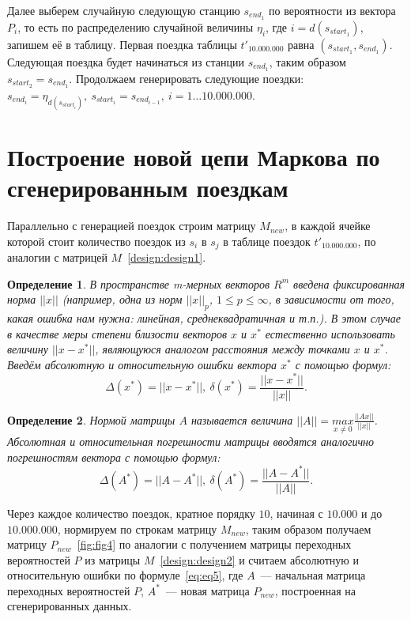 \documentclass[specialist, substylefile = spbu_report.rtx, subf,href,colorlinks=true, 12pt]{disser}
\newtheorem{mydef}{Определение}
\begin{document}
Далее выберем случайную следующую станцию $s_{end_1}$ по вероятности из вектора $P_i$, то есть по распределению случайной величины $\eta_i$, где $i = d(s_{start_1})$, запишем её в таблицу. Первая поездка таблицы $t'_{10.000.000}$ равна $\left(s_{start_1}, s_{end_1}\right)$. Следующая поездка будет начинаться из станции $s_{end_1}$, таким образом $s_{start_2} = s_{end_1}$. Продолжаем генерировать следующие поездки: $s_{end_i} = \eta_{d(s_{start_i})}, \ s_{start_i} = s_{end_{i-1}}, \ i = 1 \ldots 10.000.000$.

\section{Построение новой цепи Маркова по сгенерированным поездкам}
Параллельно с генерацией поездок строим матрицу $M_{new}$, в каждой ячейке которой стоит количество поездок из $s_i$ в $s_j$ в таблице поездок $t'_{10.000.000}$, по аналогии с матрицей $M$~\eqref{design:design1}.

\begin{mydef}\label{eq:eq4}
	В пространстве m-мерных векторов $R^m$ введена фиксированная норма $||x||$ (например, одна из норм $||x||_p$, $1 \leq p \leq \infty$, в зависимости от того, какая ошибка нам нужна: линейная, среднеквадратичная и т.п.). В этом случае в качестве меры степени близости векторов $x$ и $x^{*}$ естественно использовать величину $||x - x^{*}||$, являющуюся аналогом расстояния между точками $x$ и $x^{*}$. \\ Введём абсолютную и относительную ошибки вектора $x^{*}$ с помощью формул:
	\begin{equation*}
		\Delta\left(x^{*}\right) = ||x - x^{*}||, \  \delta\left(x^{*}\right) = \frac{||x - x^{*}||}{||x||}. 
	\end{equation*}
\end{mydef}

\begin{mydef}\label{eq:eq5}
	Нормой матрицы $A$ называется величина $||A|| = \underset{x \neq 0}{max}\frac{||Ax||}{||x||}$. \\
	Абсолютная и относительная погрешности матрицы вводятся аналогично погрешностям вектора с помощью формул:
	\begin{equation*}
		\Delta\left(A^{*}\right) = ||A - A^{*}||, \
		\delta\left(A^{*}\right) = \frac{||A - A^{*}||}{||A||}.
	\end{equation*}
\end{mydef}

Через каждое количество поездок, кратное порядку $10$, начиная с $10.000$ и до $10.000.000$, нормируем по строкам матрицу $M_{new}$, таким образом получаем матрицу $P_{new}$~\eqref{fig:fig4} по аналогии с получением матрицы переходных вероятностей $P$ из матрицы $M$~\eqref{design:design2} и считаем абсолютную и относительную ошибки по формуле~\eqref{eq:eq5}, где $A$~--- начальная матрица переходных вероятностей $P$, $A^{*}$~--- новая матрица $P_{new}$, построенная на сгенерированных данных.
\end{document}
